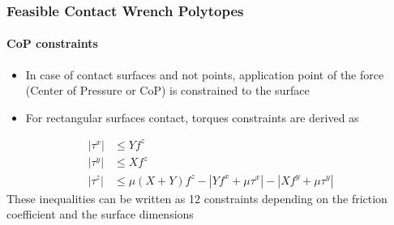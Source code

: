 \documentclass[10pt]{beamer}
\begin{document}
\begin{frame}
  \frametitle{Feasible Contact Wrench Polytopes}
  \framesubtitle{CoP constraints}
  \begin{itemize}
    \item In case of contact surfaces and not points, application point of the force (Center of Pressure or
      CoP) is constrained to the surface
    \item For rectangular surfaces contact, torques constraints are derived as 
  \end{itemize}
  \begin{align}
    |\tau^x| &\leq Y f^z \\
    |\tau^y| &\leq X f^z \\
    |\tau^z| &\leq \mu(X + Y)f^z - |Yf^x + \mu\tau^x| - |Xf^y + \mu\tau^y|
  \end{align}
  These inequalities can be written as 12 constraints depending on the friction coefficient and the surface dimensions
\end{frame}
\end{document}
